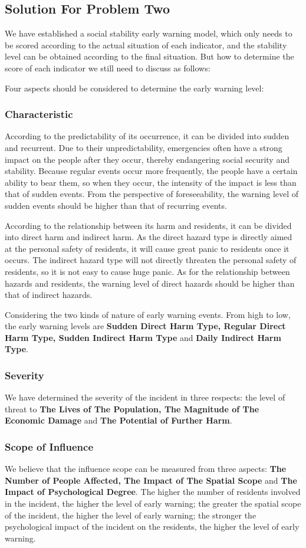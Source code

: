 \documentclass[12pt]{article}  %
\begin{document}
\restoregeometry
\subsection{Solution For Problem Two}
We have established a social stability early warning model, which only needs to be scored according to the actual situation of each indicator, and the stability level can be obtained according to the final situation. But how to determine the score of each indicator we still need to discuss as follows:

Four aspects should be considered to determine the early warning level:
\subsubsection{Characteristic}
According to the predictability of its occurrence, it can be divided into sudden and recurrent. Due to their unpredictability, emergencies often have a strong impact on the people after they occur, thereby endangering social security and stability. Because regular events occur more frequently, the people have a certain ability to bear them, so when they occur, the intensity of the impact is less than that of sudden events. From the perspective of foreseeability, the warning level of sudden events should be higher than that of recurring events.

According to the relationship between its harm and residents, it can be divided into direct harm and indirect harm. As the direct hazard type is directly aimed at the personal safety of residents, it will cause great panic to residents once it occurs. The indirect hazard type will not directly threaten the personal safety of residents, so it is not easy to cause huge panic. As for the relationship between hazards and residents, the warning level of direct hazards should be higher than that of indirect hazards.

Considering the two kinds of nature of early warning events. From high to low, the early warning levels are \textbf{Sudden Direct Harm Type, Regular Direct Harm Type, Sudden Indirect Harm Type} and \textbf{Daily Indirect Harm Type}.
\subsubsection{Severity}
We have determined the severity of the incident in three respects: the level of threat to \textbf{The Lives of The Population, The Magnitude of The Economic Damage} and \textbf{The Potential of Further Harm}.
\subsubsection{Scope of Influence}
We believe that the influence scope can be measured from three aspects: \textbf{The Number of People Affected, The Impact of The Spatial Scope} and \textbf{The Impact of Psychological Degree}. The higher the number of residents involved in the incident, the higher the level of early warning; the greater the spatial scope of the incident, the higher the level of early warning; the stronger the psychological impact of the incident on the residents, the higher the level of early warning.
\end{document}
